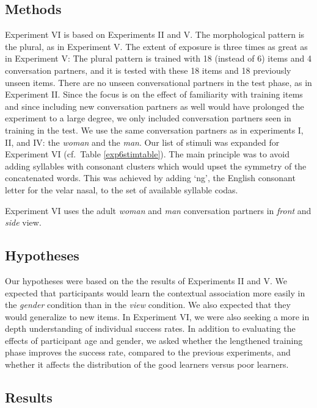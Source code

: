 \documentclass{frontiersSCNS} %
\begin{document}
\subsection{Methods}

Experiment VI is based on Experiments II and V. The morphological pattern is the plural, as in Experiment V.  The extent of exposure is three times as great as  in Experiment V:  The plural pattern is trained with 18 (instead of 6) items and 4 conversation partners, and it is tested with these 18 items and 18 previously unseen items. There are no unseen conversational partners in the test phase, as in Experiment II.  Since the focus is on the effect of familiarity with training items and since including new conversation partners as well would have prolonged the experiment to a large degree, we only included conversation partners seen in training in the test. We use the same conversation partners as in experiments I, II, and IV: the {\it woman} and the {\it man}. Our list of stimuli was expanded for Experiment VI (cf.\ Table \ref{exp6stimtable}). The main principle was to avoid adding syllables with consonant clusters which would upset the symmetry of the concatenated words. This was achieved by adding `ng', the English consonant letter for the velar nasal, to the set of available syllable codas.

Experiment VI uses the adult {\it woman} and {\it man} conversation partners in {\it front} and {\it side} view.

\subsection{Hypotheses}

Our hypotheses were based on the the results of Experiments II and V. We expected that participants would learn the contextual association more easily in the \emph{gender} condition than in the \emph{view} condition. We also expected that they would generalize to new items. In Experiment VI, we were also seeking a more in depth understanding of individual success rates. In addition to evaluating the effects of participant age and gender, we asked whether the lengthened training phase improves the success rate, compared to the previous experiments, and whether it affects the distribution of the good learners versus poor learners. 

\subsection{Results}
\end{document}
